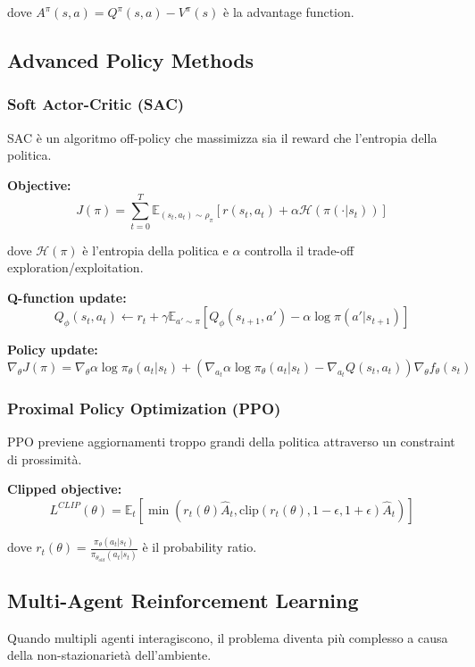 \documentclass[12pt,a4paper,twoside]{report}
\begin{document}
dove $A^{\pi}(s,a) = Q^{\pi}(s,a) - V^{\pi}(s)$ è la advantage function.

\subsection{Advanced Policy Methods}

\subsubsection{Soft Actor-Critic (SAC)}

SAC è un algoritmo off-policy che massimizza sia il reward che l'entropia della politica.

\textbf{Objective:}
$$J(\pi) = \sum_{t=0}^{T} \mathbb{E}_{(s_t,a_t) \sim \rho_{\pi}}[r(s_t, a_t) + \alpha \mathcal{H}(\pi(\cdot|s_t))]$$

dove $\mathcal{H}(\pi)$ è l'entropia della politica e $\alpha$ controlla il trade-off exploration/exploitation.

\textbf{Q-function update:}
$$Q_{\phi}(s_t, a_t) \leftarrow r_t + \gamma \mathbb{E}_{a' \sim \pi}[Q_{\phi}(s_{t+1}, a') - \alpha \log \pi(a'|s_{t+1})]$$

\textbf{Policy update:}
$$\nabla_{\theta} J(\pi) = \nabla_{\theta} \alpha \log \pi_{\theta}(a_t|s_t) + (\nabla_{a_t} \alpha \log \pi_{\theta}(a_t|s_t) - \nabla_{a_t} Q(s_t, a_t)) \nabla_{\theta} f_{\theta}(s_t)$$

\subsubsection{Proximal Policy Optimization (PPO)}

PPO previene aggiornamenti troppo grandi della politica attraverso un constraint di prossimità.

\textbf{Clipped objective:}
$$L^{CLIP}(\theta) = \mathbb{E}_t[\min(r_t(\theta) \hat{A}_t, \text{clip}(r_t(\theta), 1-\epsilon, 1+\epsilon) \hat{A}_t)]$$

dove $r_t(\theta) = \frac{\pi_{\theta}(a_t|s_t)}{\pi_{\theta_{old}}(a_t|s_t)}$ è il probability ratio.

\subsection{Multi-Agent Reinforcement Learning}

Quando multipli agenti interagiscono, il problema diventa più complesso a causa della non-stazionarietà dell'ambiente.
\end{document}
